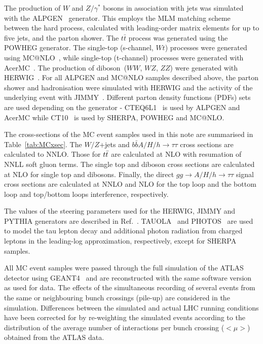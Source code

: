The production of $W$ and $Z/\gamma^*$ bosons in association with jets
was simulated with the ALPGEN~\cite{Alpgen} generator. This employs
the MLM matching scheme~\cite{MLM} between the hard process,
calculated with leading-order matrix elements for up to five jets, and
the parton shower.  The $t\bar{t}$ process was generated using the POWHEG generator. The single-top (s-channel, $Wt$)
processes were generated using MC@NLO~\cite{MCatNLO}, while single-top
(t-channel) processes were generated with AcerMC~\cite{AcerMC}.  The
production of diboson~($WW$, $WZ$, $ZZ$) were generated with
HERWIG~\cite{Herwig}.  For all ALPGEN and MC@NLO samples described
above, the parton shower and hadronisation were simulated with HERWIG
and the activity of the underlying event with JIMMY~\cite{JIMMY}.
Different parton density functions (PDFs) sets are used depending on
the generator - CTEQ6L1~\cite{CTEQ6} is used by ALPGEN and AcerMC while
CT10~\cite{CT10} is used by SHERPA, POWHEG and MC@NLO. 

The cross-sections of
the MC event samples used in this note are summarised in
Table~\ref{tab:MCxsec}. The $W/Z$+jets and $b\bar{b}A/H/h\rightarrow \tau\tau$ cross sections are calculated to NNLO. Those for $t\bar{t}$ are calculated at NLO with resumation of NNLL soft gluon terms. The single top and diboson cross sections are calculated at NLO for single top and dibosons. Finally, the direct $gg\rightarrow A/H/h\rightarrow \tau\tau$ signal cross sections 
are calculated at NNLO and NLO for the top loop and the bottom loop and top/bottom loops interference, respectively.

The values of the steering parameters used for the HERWIG, JIMMY and PYTHIA
generators are described in Ref.~\cite{ATLASMC09Tune}.
TAUOLA~\cite{TAUOLA} and PHOTOS~\cite{PHOTOS} are used to model the
tau lepton decay and additional photon radiation from charged leptons
in the leading-log approximation, respectively, except for SHERPA
samples.  

All MC event samples were passed through the full simulation
of the ATLAS detector using GEANT4~\cite{Geant4,ATLASSIM} and are
reconstructed with the same software version as used for data. The effects of the 
simultaneous recording of several events from the
same or neighbouring bunch crossings (pile-up) are considered in the
simulation. Differences between the simulated and actual LHC running
conditions have been corrected for by re-weighting the simulated
events according to the distribution of the average number of
interactions per bunch crossing ($<\mu>$) obtained from the ATLAS
data.

